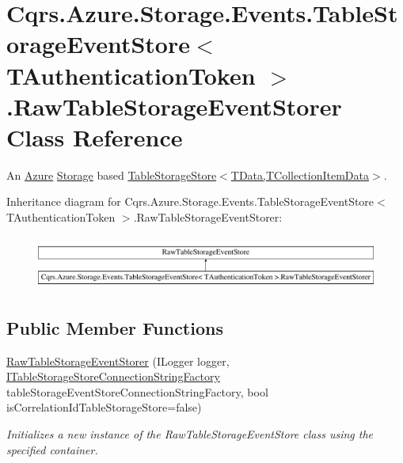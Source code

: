\hypertarget{classCqrs_1_1Azure_1_1Storage_1_1Events_1_1TableStorageEventStore_1_1RawTableStorageEventStorer}{}\section{Cqrs.\+Azure.\+Storage.\+Events.\+Table\+Storage\+Event\+Store$<$ T\+Authentication\+Token $>$.Raw\+Table\+Storage\+Event\+Storer Class Reference}
\label{classCqrs_1_1Azure_1_1Storage_1_1Events_1_1TableStorageEventStore_1_1RawTableStorageEventStorer}


An \hyperlink{namespaceCqrs_1_1Azure}{Azure} \hyperlink{namespaceCqrs_1_1Azure_1_1Storage}{Storage} based \hyperlink{classCqrs_1_1Azure_1_1BlobStorage_1_1Events_1_1TableStorageEventStore_ad86c24c28321c16b1f3601b3e7d870c4_ad86c24c28321c16b1f3601b3e7d870c4}{Table\+Storage\+Store$<$\+T\+Data,\+T\+Collection\+Item\+Data$>$}.  


Inheritance diagram for Cqrs.\+Azure.\+Storage.\+Events.\+Table\+Storage\+Event\+Store$<$ T\+Authentication\+Token $>$.Raw\+Table\+Storage\+Event\+Storer\+:\begin{figure}[H]
\begin{center}
\leavevmode
\includegraphics[height=1.777778cm]{classCqrs_1_1Azure_1_1Storage_1_1Events_1_1TableStorageEventStore_1_1RawTableStorageEventStorer}
\end{center}
\end{figure}
\subsection*{Public Member Functions}
\begin{DoxyCompactItemize}
\item 
\hyperlink{classCqrs_1_1Azure_1_1Storage_1_1Events_1_1TableStorageEventStore_1_1RawTableStorageEventStorer_af5ed87f6a4d32ff3581a6d2ae107dcd1_af5ed87f6a4d32ff3581a6d2ae107dcd1}{Raw\+Table\+Storage\+Event\+Storer} (I\+Logger logger, \hyperlink{interfaceCqrs_1_1Azure_1_1BlobStorage_1_1ITableStorageStoreConnectionStringFactory}{I\+Table\+Storage\+Store\+Connection\+String\+Factory} table\+Storage\+Event\+Store\+Connection\+String\+Factory, bool is\+Correlation\+Id\+Table\+Storage\+Store=false)
\begin{DoxyCompactList}\small\item\em Initializes a new instance of the Raw\+Table\+Storage\+Event\+Store class using the specified container. \end{DoxyCompactList}\end{DoxyCompactItemize}
